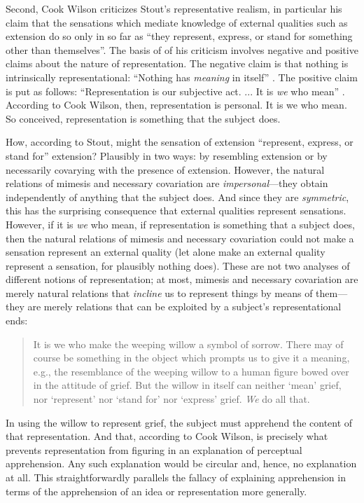 Second, Cook Wilson criticizes Stout’s \citeyearpar[144]{Stout:1903zl} representative realism, in particular his claim that the sensations which mediate knowledge of external qualities such as extension do so only in so far as ``they represent, express, or stand for something other than themselves''. The basis of of his criticism involves negative and positive claims about the nature of representation. The negative claim is that nothing is intrinsically representational: ``Nothing has \emph{meaning} in itself'' \citep[770]{Cook-Wilson:1926sf}. The positive claim is put as follows: ``Representation is our subjective act. ... It is \emph{we} who mean'' \citep[770]{Cook-Wilson:1926sf}. According to Cook Wilson, then, representation is personal. It is we who mean. So conceived, representation is something that the subject does. 

How, according to Stout, might the sensation of extension ``represent, express, or stand for'' extension? Plausibly in two ways: by resembling extension or by necessarily covarying with the presence of extension. However, the natural relations of mimesis and necessary covariation are \emph{impersonal}---they obtain independently of anything that the subject does. And since they are \emph{symmetric}, this has the surprising consequence that external qualities represent sensations. However, if it is \emph{we} who mean, if representation is something that a subject does, then the natural relations of mimesis and necessary covariation could not make a sensation represent an external quality (let alone make an external quality represent a sensation, for plausibly nothing does). These are not two analyses of different notions of representation; at most, mimesis and necessary covariation are merely natural relations that \emph{incline} us to represent things by means of them---they are merely relations that can be exploited by a subject's representational ends:
\begin{quote}
	It is we who make the weeping willow a symbol of sorrow. There may of course be something in the object which prompts us to give it a meaning, e.g., the resemblance of the weeping willow to a human figure bowed over in the attitude of grief. But the willow in itself can neither `mean' grief, nor `represent' nor `stand for' nor `express' grief. \emph{We} do all that.  \citep[770]{Cook-Wilson:1926sf}
\end{quote}
In using the willow to represent grief, the subject must apprehend the content of that representation. And that, according to Cook Wilson, is precisely what prevents representation from figuring in an explanation of perceptual apprehension. Any such explanation would be circular and, hence, no explanation at all. This straightforwardly parallels the fallacy of explaining apprehension in terms of the apprehension of an idea or representation more generally.

